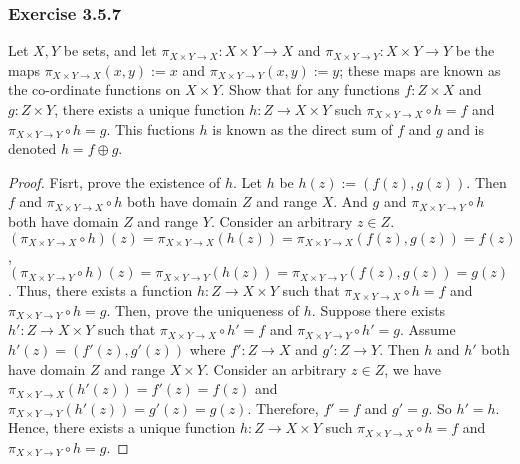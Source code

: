 \documentclass[12pt, letter]{article}
\begin{document}
\subsubsection*{Exercise 3.5.7}
Let $X,Y$ be sets, and let $\pi_{X\times Y\to X}:X\times Y\to X$ and $\pi_{X\times Y\to Y}:X\times Y\to Y$ be the maps $\pi_{X\times Y\to X}(x,y):=x$ and
$\pi_{X\times Y\to Y}(x,y):=y$; these maps are known as the co-ordinate functions on $X\times Y$. Show that for any functions $f:Z\times X$ and $g:Z\times Y$, there exists a unique
function $h:Z\to X\times Y$ such $\pi_{X\times Y\to X}\circ h=f$ and $\pi_{X\times Y\to Y}\circ h=g$. This fuctions $h$ is known as the direct sum of $f$ and $g$ and is denoted $h=f\oplus g$.
\begin{proof}
    Fisrt, prove the existence of $h$. Let $h$ be $h(z):=(f(z),g(z))$. Then $f$ and $\pi_{X\times Y\to X}\circ h$ both have domain $Z$ and range $X$. And $g$ and $\pi_{X\times Y\to Y}\circ h$
    both have domain $Z$ and range $Y$. Consider an arbitrary $z\in Z$. $(\pi_{X\times Y\to X}\circ h)(z)=\pi_{X\times Y\to X}(h(z))=\pi_{X\times Y\to X}(f(z),g(z))=f(z)$,
    $(\pi_{X\times Y\to Y}\circ h)(z)=\pi_{X\times Y\to Y}(h(z))=\pi_{X\times Y\to Y}(f(z),g(z))=g(z)$. Thus, there exists a function $h:Z\to X\times Y$ such that 
    $\pi_{X\times Y\to X}\circ h=f$ and $\pi_{X\times Y\to Y}\circ h=g$. Then, prove the uniqueness of $h$. Suppose there exists $h':Z\to X\times Y$ such that $\pi_{X\times Y\to X}\circ h'=f$ and $\pi_{X\times Y\to Y}\circ h'=g$. 
    Assume $h'(z)=(f'(z),g'(z))$ where $f':Z\to X$ and $g':Z\to Y$. Then $h$ and $h'$ both have domain $Z$ and range $X\times Y$. Consider an arbitrary $z\in Z$, we have $\pi_{X\times Y\to X}(h'(z))=f'(z)=f(z)$
    and $\pi_{X\times Y\to Y}(h'(z))=g'(z)=g(z)$. Therefore, $f'=f$ and $g'=g$. So $h'=h$. Hence, there exists a unique function $h:Z\to X\times Y$ such $\pi_{X\times Y\to X}\circ h=f$ and $\pi_{X\times Y\to Y}\circ h=g$.
\end{proof}
\end{document}
